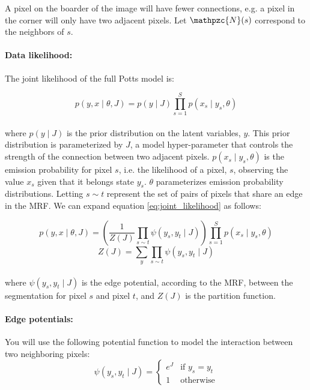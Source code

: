 \documentclass[11pt]{article}
\begin{document}
A pixel on the boarder of the image will have fewer connections, e.g. a pixel in the corner will only have two adjacent pixels. Let $\mathpzc{N}(s)$ correspond to the neighbors of $s$.

\paragraph{Data likelihood:}
The joint likelihood of the full Potts model is:

\begin{equation}\label{eq:joint_likelihood}
  p(y, x \mid \theta, J) = p(y \mid J)\prod_{s=1}^S p(x_s \mid y_s,\theta) \end{equation}
  \\
  where $p(y \mid J)$ is the prior distribution on the latent variables, $y$. This prior distribution is parameterized by $J$, a model hyper-parameter that controls the strength of the connection between two adjacent pixels.
    $p(x_s \mid y_s, \theta)$ is the emission probability for pixel $s$, i.e. the likelihood of a pixel, $s$, observing the value $x_s$ given that it belongs state $y_s$. $\theta$ parameterizes emission probability distributions. Letting $s\sim t$ represent the set of pairs of pixels that share an edge in the MRF. We can expand equation \ref{eq:joint_likelihood} as follows:

\begin{equation}\label{eq:expanded_joint_likelihood}
  p(y, x \mid \theta, J)  = \left(\frac{1}{Z(J)}\prod_{s\sim t}\psi(y_s,y_t \mid J) \right)\prod_{s=1}^S p(x_s \mid y_s,\theta) \end{equation}
\begin{equation}\label{eq:partition_function}
  Z(J) = \sum_y \prod_{s\sim t}\psi(y_s,y_t \mid J)  \end{equation}
\\
where $\psi(y_s, y_t \mid J)$ is the edge potential, according to the MRF, between the segmentation for pixel $s$ and pixel $t$, and $Z(J)$ is the partition function.
\paragraph{Edge potentials:}
You will use the following potential function to model the interaction between two neighboring pixels:
\begin{equation}\label{eq:potential_function}
\psi(y_s, y_t \mid J)= \begin{cases}
      e^{J} & \text{if } y_s = y_t \\
      1 &  \text{otherwise}
   \end{cases}
\end{equation}
\end{document}
